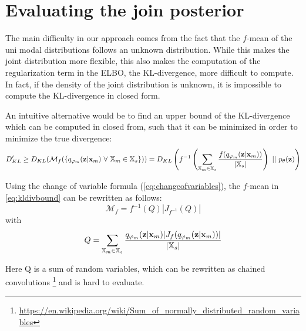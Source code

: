 
\section{Evaluating the join posterior}
The main difficulty in our approach comes from the fact that the $f$-mean of the uni modal distributions follows an unknown distribution.
While this makes the joint distribution more flexible, this also makes the computation of the regularization term in the ELBO, the KL-divergence, more difficult to compute.
In fact, if the density of the joint distribution is unknown, it is impossible to compute the KL-divergence in closed form.

An intuitive alternative would be to find an upper bound of the KL-divergence which can be computed in closed from, such that it can be minimized in order to minimize the true divergence:
\begin{equation}
    \label{eq:kldivbound}
    D_{KL}^{\prime} \geq D_{KL}(\mathcal{M}_f(\{\unimodalpost\ \forall\ \xsetm \in \xsubset\})) =  D_{KL}\left(f^{-1}\left(\sum _{\xsetm \in \xsubset} \frac{f(\unimodalpost)}{|\xsubset|}\right)\ ||\ \prior\right)
\end{equation}

Using the change of variable formula (\cref{eq:changeofvariables}), the $f$-mean in \cref{eq:kldivbound} can be rewritten as follows:
\begin{equation}
    \mathcal{M}_f = f^{-1}(Q)|J_{f^{-1}}(Q)|
\end{equation}
with
\begin{equation}
    Q= \sum _{\mathbb{X}_m \in \mathbb{X}_s} \frac{q_{\varphi_m}(\textbf{z}|\textbf{x}_m)|J_f(q_{\varphi_m}(\textbf{z}|\textbf{x}_m))|}{|\mathbb{X}_s|}
\end{equation}

Here Q is a sum of random variables, which can be rewritten as chained convolutions \footnote{\url{https://en.wikipedia.org/wiki/Sum_of_normally_distributed_random_variables}} and is hard to evaluate.

